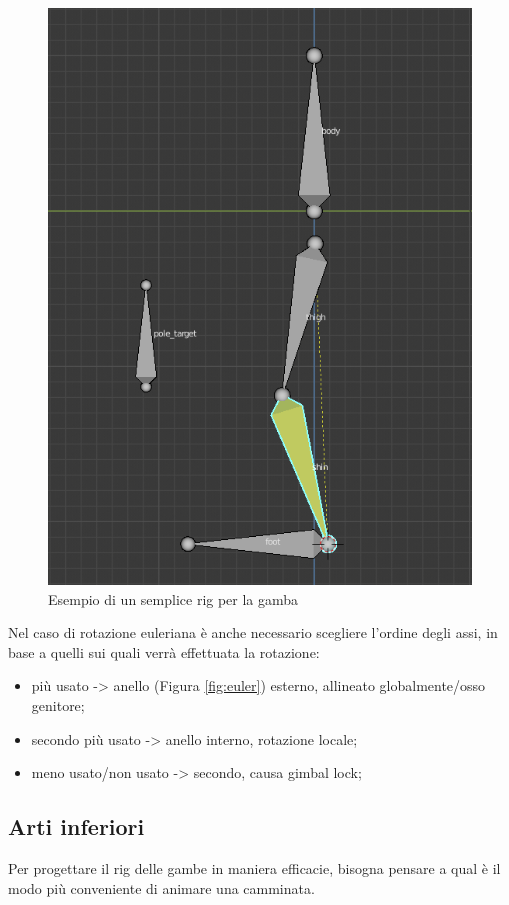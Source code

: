 \newpage
\begin{figure}
\centering
\includegraphics[width=.8\textwidth]{Figures/leg}
\decoRule
\caption[Rig gamba]{Esempio di un semplice rig per la gamba}
\label{fig:leg}
\end{figure}

Nel caso di rotazione euleriana è anche necessario scegliere l'ordine degli assi, in base a quelli sui quali verrà effettuata la rotazione:
\begin{itemize}
    \item più usato -> anello (Figura \ref{fig:euler}) esterno, allineato globalmente/osso genitore;
    \item secondo più usato -> anello interno, rotazione locale;
    \item meno usato/non usato -> secondo, causa gimbal lock;
\end{itemize}

\newpage
\subsection{Arti inferiori}

Per progettare il rig delle gambe in maniera efficacie, bisogna pensare a qual è il modo più conveniente di animare una camminata.

